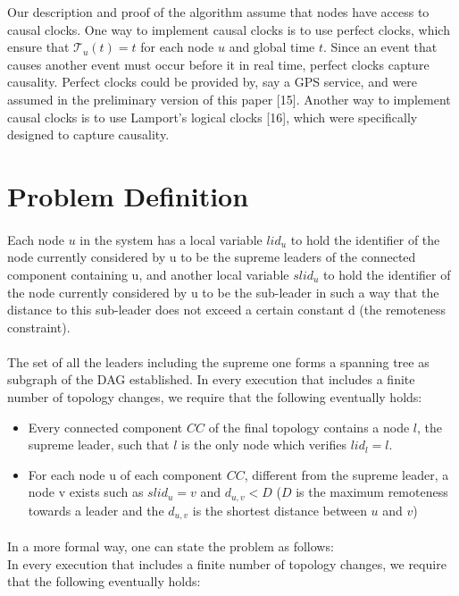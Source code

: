 Our description and proof of the algorithm assume that nodes have access to causal clocks. One way to implement causal clocks is to use perfect clocks, which ensure that $\mathcal{T}_u(t) = t$ for each node $u$ and global time $t$. Since an event that causes another event must occur before it in real time, perfect clocks capture causality. Perfect clocks could be provided by, say a GPS service, and were assumed in the preliminary version of this paper [15]. Another way to implement causal clocks is to use Lamport’s logical clocks [16], which were specifically designed to capture causality.
\newpage
\section{Problem Definition}
\paragraph{}Each node $u$ in the system has a local variable $lid_{u}$ to hold the identifier of the node currently considered by u to be the supreme leaders of the connected component containing u, and another local variable $slid_u$ to hold the identifier of the node currently considered by u to be the sub-leader in such a way that the distance to this sub-leader does not exceed a certain constant d (the remoteness constraint).
\paragraph{}The set of all the leaders including the supreme one forms a spanning tree as subgraph of the DAG established.
In every execution that includes a finite number of topology changes, we require that the following eventually holds:
\begin{itemize}
	\item Every connected component $CC$ of the final topology contains a node $l$, the supreme leader, such that $l$ is the only node which verifies $ lid_{l} = l $.
	\item For each node u of each component $CC$, different from the supreme leader, a node v exists such as $slid_{u} = v$ and $d_{u,v} < D$ ($D$ is the maximum remoteness towards a leader and the $ d_{u,v} $ is the shortest distance between $u$ and $v$)
\end{itemize}

\paragraph{}In a more formal way, one can state the problem as follows:\\
In every execution that includes a finite number of topology changes, we require that the following eventually holds:

